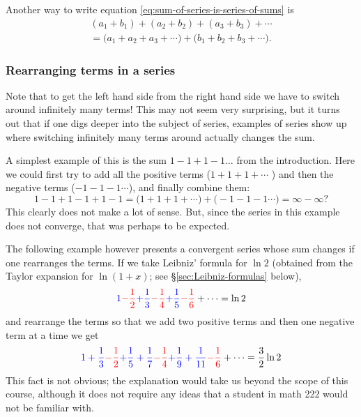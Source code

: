 Another way to write equation \eqref{eq:sum-of-series-is-series-of-sums} is
\begin{multline*}
  (a_1+b_1) + (a_2+b_2) + (a_3+b_3) + \cdots \\
  =
  \bigl( a_1+a_2+a_3+\cdots \bigr) + 
  \bigl( b_1+b_2+b_3+\cdots \bigr).
\end{multline*}

\subsubsection*{Rearranging terms in a series}
Note that to get the left hand side from the right hand side we have to switch
around infinitely many terms!
This may not seem very surprising, but it turns out that if one digs deeper into
the subject of series, examples of series show up where switching infinitely
many terms around actually changes the sum.  

A simplest example of this is the sum $1 - 1 + 1 - 1\ldots$ from the
introduction.  Here we could first try to add all the positive terms
($1+1+1+\cdots$ ) and then the negative terms ($-1-1-1\cdots$), and finally
combine them:
\[
  1-1+1-1+1-1 = \bigl(1+1+1+\cdots\bigr) + \bigl(-1-1-1\cdots\bigr) = \infty - \infty ?
\]
This clearly does not make a lot of sense.
But, since the series in this example does not converge, that was perhaps to be
expected.  

The following example however presents a convergent series whose sum changes if
one rearranges the terms.  If we take Leibniz' formula for $\ln 2$ (obtained
from the Taylor expansion for $\ln(1+x)$; see \S\ref{sec:Leibniz-formulas}
below),
\begin{equation}
  {\color{blue}1}
  {\color{red}-\frac12}
  {\color{blue}+\frac13}
  {\color{red}-\frac14}
  {\color{blue}+\frac15}
  {\color{red}-\frac16}+\cdots = \ln 2
\end{equation}
and rearrange the terms so that we add two positive terms and then one negative
term at a time we get
\begin{equation}
  {\color{blue}1+\frac13}
  {\color{red}-\frac12}
  {\color{blue}+\frac15+\frac17}
  {\color{red}-\frac14}
  {\color{blue}+\frac19+\frac1{11}}
  {\color{red}- \frac16}
  +\cdots = \frac32\ln 2
\end{equation}
This fact is not obvious;  the explanation would take us beyond the scope of
this course, although it does not require any ideas that a student in math 222
would not be familiar with.

